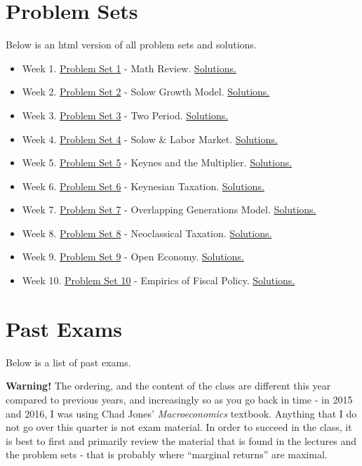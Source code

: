 \documentclass[]{book}
\providecommand{\tightlist}{%
  \setlength{\itemsep}{0pt}\setlength{\parskip}{0pt}}
\theoremstyle{definition}
\theoremstyle{definition}
\theoremstyle{definition}
\theoremstyle{remark}
\begin{document}
\section*{Problem Sets}\label{problem-sets}

Below is an html version of all problem sets and solutions.

\begin{itemize}
\tightlist
\item
  Week 1. \protect\hyperlink{pset1}{Problem Set 1} - Math Review.
  \protect\hyperlink{pset1-sol}{Solutions.}
\item
  Week 2. \protect\hyperlink{pset2}{Problem Set 2} - Solow Growth Model.
  \protect\hyperlink{pset2-sol}{Solutions.}
\item
  Week 3. \protect\hyperlink{pset3}{Problem Set 3} - Two Period.
  \protect\hyperlink{pset3-sol}{Solutions.}
\item
  Week 4. \protect\hyperlink{pset4}{Problem Set 4} - Solow \& Labor
  Market. \protect\hyperlink{pset4-sol}{Solutions.}
\item
  Week 5. \protect\hyperlink{pset5}{Problem Set 5} - Keynes and the
  Multiplier. \protect\hyperlink{pset5-sol}{Solutions.}
\item
  Week 6. \protect\hyperlink{pset6}{Problem Set 6} - Keynesian Taxation.
  \protect\hyperlink{pset6-sol}{Solutions.}
\item
  Week 7. \protect\hyperlink{pset7}{Problem Set 7} - Overlapping
  Generations Model. \protect\hyperlink{pset7-sol}{Solutions.}
\item
  Week 8. \protect\hyperlink{pset8}{Problem Set 8} - Neoclassical
  Taxation. \protect\hyperlink{pset8-sol}{Solutions.}
\item
  Week 9. \protect\hyperlink{pset9}{Problem Set 9} - Open Economy.
  \protect\hyperlink{pset9-sol}{Solutions.}
\item
  Week 10. \protect\hyperlink{pset10}{Problem Set 10} - Empirics of
  Fiscal Policy. \protect\hyperlink{pset10-sol}{Solutions.}
\end{itemize}

\section*{Past Exams}\label{past-exams}

Below is a list of past exams.

\textbf{Warning!} The ordering, and the content of the class are
different this year compared to previous years, and increasingly so as
you go back in time - in 2015 and 2016, I was using Chad Jones'
\emph{Macroeconomics} textbook. Anything that I do not go over this
quarter is not exam material. In order to succeed in the class, it is
best to first and primarily review the material that is found in the
lectures and the problem sets - that is probably where ``marginal
returns'' are maximal.
\end{document}
